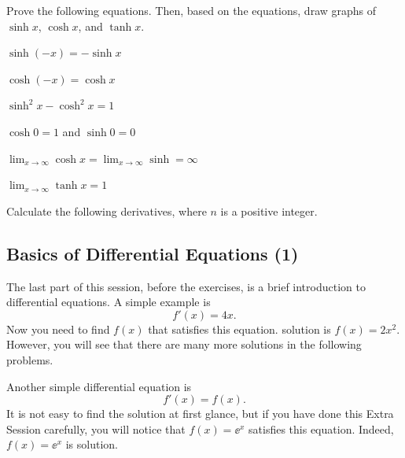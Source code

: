 \documentclass[11pt,pdfa,lastpage]{MishoNote}
\newcommand\starskip{\bigskip\begin{center}\pgfornament[width=7cm]{88}\end{center}\medskip}
\begin{document}
\starskip

\begin{enumerate}[resume]
  \itemA Prove the following equations. Then, based on the equations, draw graphs of $\sinh x$, $\cosh x$, and $\tanh x$.
  \begin{menumerate}{2}
    \item $\sinh(-x)=-\sinh x$
    \item $\cosh(-x)=\cosh x$
    \item $\sinh^2x-\cosh^2x=1$
    \item $\cosh 0=1$ and $\sinh 0=0$
    \item $\displaystyle\lim_{x\to\infty}\cosh x=\lim_{x\to\infty}\sinh=\infty$
    \item $\displaystyle\lim_{x\to\infty}\tanh x=1$
  \end{menumerate}
  \itemC Calculate the following derivatives, where $n$ is a positive integer.
  \begin{menumerate}{3}
\end{menumerate}
\end{enumerate}

\newpage

\subsection{Basics of Differential Equations (1)}
The last part of this session, before the exercises, is a brief introduction to differential equations.
A simple example is
\[ f'(x)=4x. \]
Now you need to find $f(x)$ that satisfies this equation.
 solution is $f(x)=2x^2$. However, you will see that there are many more solutions in the following problems.

Another simple differential equation is
\[ f'(x) = f(x). \]
It is not easy to find the solution at first glance, but if you have done this Extra Session carefully, you will notice that $f(x)=\ee^x$ satisfies this equation. Indeed, $f(x)=\ee^x$ is  solution.

\starskip
\end{document}
